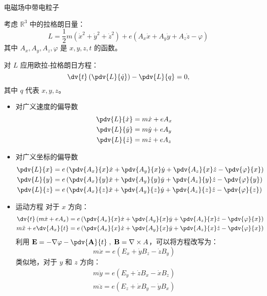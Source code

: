 \documentclass[12pt, a4paper, oneside, UTF8]{ctexbook}  %
\begin{document}
\begin{example}
电磁场中带电粒子
    
    考虑 \(\mathbb{R}^3\) 中的拉格朗日量：
    \[
    L = \frac{1}{2} m (\dot{x}^2 + \dot{y}^2 + \dot{z}^2) + e (A_x \dot{x} + A_y \dot{y} + A_z \dot{z} - \varphi)
    \]
    其中 \( A_x, A_y, A_z, \varphi \) 是 \( x, y, z, t \) 的函数。
    \begin{solution}
对 \( L \) 应用欧拉-拉格朗日方程：
\[
\dv{t} \left( \pdv{L}{\dot{q}} \right) - \pdv{L}{q} = 0,
\]
其中 \( q \) 代表 \( x, y, z \)。
\begin{itemize}
    \item 对广义速度的偏导数
\begin{align*}
\pdv{L}{\dot{x}} &= m \dot{x} + e A_x \\
\pdv{L}{\dot{y}} &= m \dot{y} + e A_y \\
\pdv{L}{\dot{z}} &= m \dot{z} + e A_z
\end{align*}
\item 对广义坐标的偏导数
\begin{align*}
\pdv{L}{x} &= e \left( \pdv{A_x}{x} \dot{x} + \pdv{A_y}{x} \dot{y} + \pdv{A_z}{x} \dot{z} - \pdv{\varphi}{x} \right) \\
\pdv{L}{y} &= e \left( \pdv{A_x}{y} \dot{x} + \pdv{A_y}{y} \dot{y} + \pdv{A_z}{y} \dot{z} - \pdv{\varphi}{y} \right) \\
\pdv{L}{z} &= e \left( \pdv{A_x}{z} \dot{x} + \pdv{A_y}{z} \dot{y} + \pdv{A_z}{z} \dot{z} - \pdv{\varphi}{z} \right)
\end{align*}
\item 运动方程
对于 \( x \) 方向：
\begin{align*}
\dv{t} \left( m \dot{x} + e A_x \right) &= e \left( \pdv{A_x}{x} \dot{x} + \pdv{A_y}{x} \dot{y} + \pdv{A_z}{x} \dot{z} - \pdv{\varphi}{x} \right) \\
m \ddot{x} + e \dv{A_x}{t} &= e \left( \pdv{A_x}{x} \dot{x} + \pdv{A_y}{x} \dot{y} + \pdv{A_z}{x} \dot{z} - \pdv{\varphi}{x} \right)
\end{align*}
利用 \(\displaystyle \mathbf{E} = -\nabla \varphi - \pdv{\mathbf{A}}{t}
\;,\; \mathbf{B}=\nabla\times A \)，可以将方程改写为：
\[
m \ddot{x} = e \left( E_x + \dot{y} B_z - \dot{z} B_y \right)
\]
类似地，对于 \( y \) 和 \( z \) 方向：
\begin{gather*}
    m \ddot{y} = e \left( E_y + \dot{z} B_x - \dot{x} B_z \right)
    \\
    m \ddot{z} = e \left( E_z + \dot{x} B_y - \dot{y} B_x \right)
\end{gather*}
\end{itemize}
    \end{solution} 
\end{example}
\end{document}
